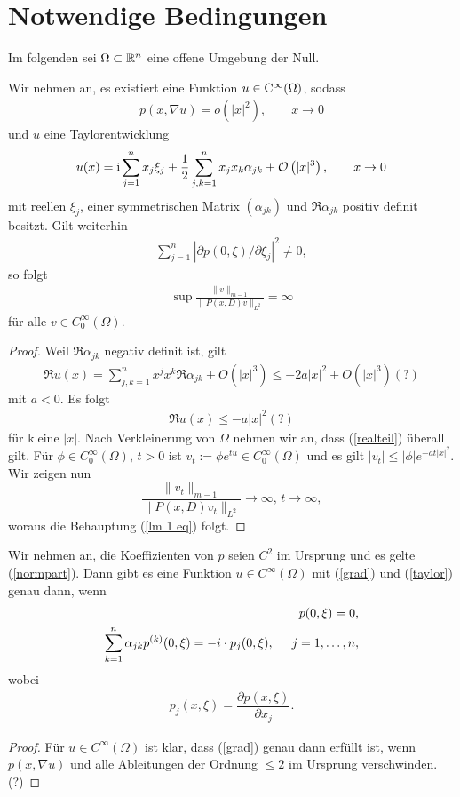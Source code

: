 \section{Notwendige Bedingungen}
Im folgenden sei $\Omega \subset \mathbb R^n$ eine offene Umgebung der Null. 
\begin{lem}
Wir nehmen an, es existiert eine Funktion $u \in \mathrm C^\infty (\Omega)$, sodass 
\begin{align}
\label{grad}
p(x, \nabla u) = o \left(|x|^2\right), \qquad  x \rightarrow 0
\end{align}
und $u$ eine Taylorentwicklung 
\begin{align}
	\label{taylor}
u(x) = \mathrm i \sum_{j=1}^{n} x_j \xi_j + \dfrac{1}{2} \sum_{j,k=1}^{n} x_j x_k \alpha_{jk} + \mathcal O\left( |x|^3 \right), \qquad x\to0
\end{align}
mit reellen $\xi_j$, einer symmetrischen Matrix $(\alpha_{jk})$ und $\Re \alpha_{jk}$ positiv definit besitzt. Gilt weiterhin  
\begin{align}
\label{normpart}
\sum_{j=1}^{n}|\partial p(0,\xi)/\partial \xi_j|^2 \neq 0,
\end{align}
so folgt
\begin{align}
\label{lm 1 eq}
\sup \frac{ \lVert v \rVert_{m-1} }{ \lVert P(x,D)v \rVert_{L^2}} = \infty
\end{align}
für alle $v \in C_0^\infty(\Omega)$.
\end{lem}
\begin{proof}
Weil $\Re \alpha_{jk}$ negativ definit ist, gilt\begin{align*}
\Re u(x) = \sum_{j,k=1}^{n} x^jx^k \Re \alpha_{jk} + O\left( |x|^3 \right) \le -2a |x|^2 + O\left( |x|^3 \right) (?)
\end{align*}
mit $a<0$. Es folgt
\begin{align}
\label{realteil}
\Re u(x) \le -a |x|^2 (?)
\end{align}
für kleine $|x|$. Nach Verkleinerung von $\Omega$ nehmen wir an, dass (\ref{realteil}) überall gilt. Für $\phi \in C_0^\infty(\Omega)$, $t>0$ ist $v_t := \phi e^{tu} \in C_0^\infty(\Omega)$ und es gilt $|v_t| \le |\phi| e^{-at|x|^2}$. Wir zeigen nun
\[
\frac{\lVert v_t \rVert_{m-1}}{\lVert P(x,D)v_t \rVert_{L^2}} \rightarrow \infty, \, t \rightarrow \infty,
\]
woraus die Behauptung (\ref{lm 1 eq}) folgt.
\end{proof}
\begin{lem}
Wir nehmen an, die Koeffizienten von $p$ seien $C^2$ im Ursprung und es gelte (\ref{normpart}). Dann gibt es eine Funktion $u \in C^\infty(\Omega)$ mit (\ref{grad}) und (\ref{taylor}) genau dann, wenn
\begin{align}
p(0, \xi) = 0, \\
\sum_{k=1}^{n} \alpha_{jk}p^{(k)}(0,\xi) = -i \cdot p_j(0,\xi), \hspace{0.5cm} j=1, \ldots, n,
\end{align}
wobei
\begin{align}
p_j(x,\xi) = \dfrac{\partial p(x,\xi)}{\partial x_j}.
\end{align}
\end{lem}

\begin{proof}
Für $u \in C^\infty(\Omega)$ ist klar, dass (\ref{grad}) genau dann erfüllt ist, wenn $p(x, \nabla u)$ und alle Ableitungen der Ordnung $\le 2$ im Ursprung verschwinden. (?)
\end{proof}